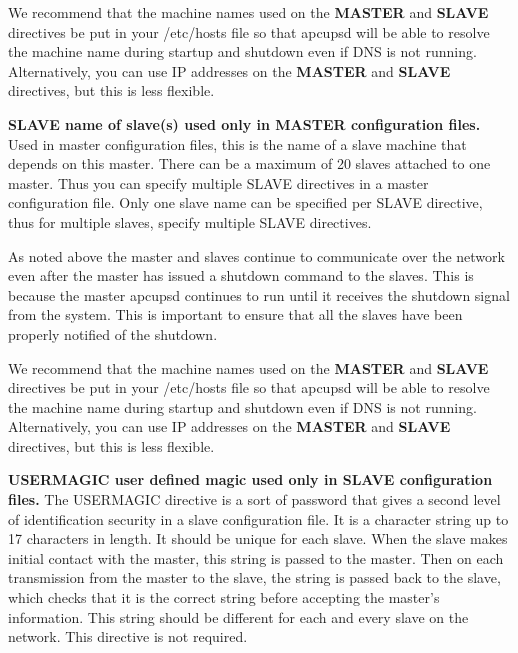 \begin{description}
We recommend that the machine names used on the {\bf MASTER} and {\bf SLAVE}
directives be put in your /etc/hosts file so that apcupsd will be able to
resolve the machine name during startup and shutdown even if DNS is not
running. Alternatively, you can use IP addresses on the {\bf MASTER} and {\bf
SLAVE} directives, but this is less flexible.  

\item {\bf SLAVE \lt{}name of slave(s)\gt{} used only in MASTER configuration
files.}
Used in master configuration files, this is the name of a slave machine that
depends on this master. There can be a maximum of 20 slaves attached to one
master. Thus you can specify multiple SLAVE directives in a master
configuration file. Only one slave name can be specified per SLAVE directive,
thus for multiple slaves, specify multiple SLAVE directives.  

As noted above the master and slaves continue to communicate over the network
even after the master has issued a shutdown command to the slaves. This is
because the master apcupsd continues to run until it receives the shutdown
signal from the system. This is important to ensure that all the slaves have
been properly notified of the shutdown.  

We recommend that the machine names used on the {\bf MASTER} and {\bf SLAVE}
directives be put in your /etc/hosts file so that apcupsd will be able to
resolve the machine name during startup and shutdown even if DNS is not
running. Alternatively, you can use IP addresses on the {\bf MASTER} and {\bf
SLAVE} directives, but this is less flexible.  

\item {\bf USERMAGIC \lt{} user defined magic\gt{} used only in SLAVE
configuration files.}
The USERMAGIC directive is a sort of password that gives a second level of
identification security in a slave configuration file. It is a character
string up to 17 characters in length. It should be unique for each slave. When
the slave makes initial contact with the master, this string is passed to the
master. Then on each transmission from the master to the slave, the string is
passed back to the slave, which checks that it is the correct string before
accepting the master's information. This string should be different for each
and every slave on the network. This directive is not required. 
\end{description}


